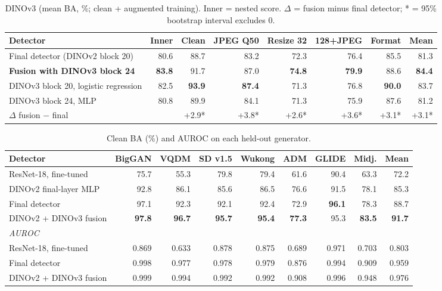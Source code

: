 \documentclass[10pt,a4paper]{article}
\newcommand{\best}[1]{\textbf{#1}}
\begin{document}
\begin{table}[H]
\centering\footnotesize
\caption{DINOv3 (mean BA, \%; clean + augmented training). Inner = nested score. $\Delta$ = fusion minus final detector; * = 95\% bootstrap interval excludes 0.}\label{tab:dinov3}
\begin{tabular}{lrrrrrrr}
\toprule
Detector & Inner & Clean & JPEG Q50 & Resize 32 & 128+JPEG & Format & Mean \\
\midrule
Final detector (DINOv2 block 20) & 80.6 & 88.7 & 83.2 & 72.3 & 76.4 & 85.5 & 81.3 \\
\textbf{Fusion with DINOv3 block 24} & \best{83.8} & 91.7 & 87.0 & \best{74.8} & \best{79.9} & 88.6 & \best{84.4} \\
DINOv3 block 20, logistic regression & 82.5 & \best{93.9} & \best{87.4} & 71.3 & 76.8 & \best{90.0} & 83.7 \\
DINOv3 block 24, MLP & 80.8 & 89.9 & 84.1 & 71.3 & 75.9 & 87.6 & 81.2 \\
\midrule
$\Delta$ fusion $-$ final & & +2.9* & +3.8* & +2.6* & +3.6* & +3.1* & +3.1* \\
\bottomrule
\end{tabular}
\end{table}

\begin{table}[H]
\centering\footnotesize
\caption{Clean BA (\%) and AUROC on each held-out generator.}\label{tab:pergen}
\setlength{\tabcolsep}{4pt}
\begin{tabular}{lrrrrrrrr}
\toprule
Detector & BigGAN & VQDM & SD v1.5 & Wukong & ADM & GLIDE & Midj. & Mean \\
\midrule
ResNet-18, fine-tuned & 75.7 & 55.3 & 79.8 & 79.4 & 61.6 & 90.4 & 63.3 & 72.2 \\
DINOv2 final-layer MLP & 92.8 & 86.1 & 85.6 & 86.5 & 76.6 & 91.5 & 78.1 & 85.3 \\
Final detector & 97.1 & 92.3 & 92.1 & 92.4 & 72.9 & \best{96.1} & 78.3 & 88.7 \\
DINOv2 + DINOv3 fusion & \best{97.8} & \best{96.7} & \best{95.7} & \best{95.4} & \best{77.3} & 95.3 & \best{83.5} & \best{91.7} \\
\midrule
\multicolumn{9}{l}{\emph{AUROC}} \\
ResNet-18, fine-tuned & 0.869 & 0.633 & 0.878 & 0.875 & 0.689 & 0.971 & 0.703 & 0.803 \\
Final detector & 0.998 & 0.977 & 0.978 & 0.979 & 0.876 & 0.994 & 0.909 & 0.959 \\
DINOv2 + DINOv3 fusion & 0.999 & 0.994 & 0.992 & 0.992 & 0.908 & 0.996 & 0.948 & 0.976 \\
\bottomrule
\end{tabular}
\end{table}
\end{document}
